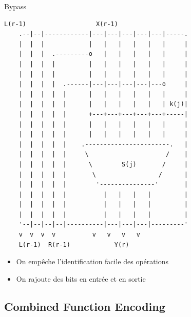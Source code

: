 \documentclass{beamer}
\begin{document}
\begin{frame}[fragile]{Bypass}

  \begin{Verbatim}[samepage=true]
    L(r-1)                   X(r-1)
    .--|--|------------|---|---|---|---|---|-----.
    |  |  |            |   |   |   |   |   |     |
    |  |  |  .---------o   |   |   |   |   |     |
    |  |  |  |         |   |   |   |   |   |     |   
    |  |  |  |         |   |   |   |   |   |     |  
    |  |  |  |  .------|---|---|---|---|---o     | 
    |  |  |  |  |      |   |   |   |   |   |     | 
    |  |  |  |  |      |   |   |   |   |   | k(j)|  
    |  |  |  |  |      +---+---+---+---+---+-----|  
    |  |  |  |  |      |   |   |   |   |   |     | 
    |  |  |  |  |      |   |   |   |   |   |     | 
    |  |  |  |  |    .-----------------------.   |              
    |  |  |  |  |     \                     /    |              
    |  |  |  |  |      \        S(j)       /     |              
    |  |  |  |  |       \                 /      |               
    |  |  |  |  |        '---------------'       |               
    |  |  |  |  |          |   |   |   |         |     
    |  |  |  |  |          |   |   |   |         | 
    |  |  |  |  |          |   |   |   |         |   
    '--|--|--|--|----------|---|---|---|---------'
    v  v  v  v          v   v   v   v 
    L(r-1)  R(r-1)            Y(r)
  \end{Verbatim}	

  \begin{itemize}
  \item On empêche l'identification facile des opérations
  \item On rajoute des bits en entrée et en sortie
  \end{itemize}

\end{frame}


\subsection{Combined Function Encoding}
\end{document}
